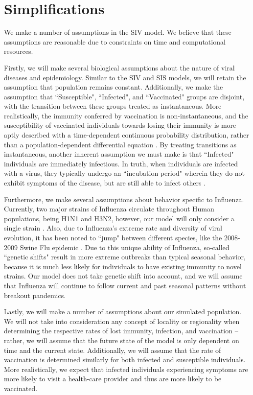\documentclass[12pt]{article}
\begin{document}
\section{Simplifications}
We make a number of assumptions in the SIV model. We believe that these assumptions are reasonable due to constraints on time and computational resources.

Firstly, we will make several biological assumptions about the nature of viral diseases and epidemiology. Similar to the SIV and SIS models, we will retain the assumption that population remains constant. Additionally, we make the assumption that ``Susceptible", ``Infected", and ``Vaccinated" groups are disjoint, with the transition between these groups treated as instantaneous. More realistically, the immunity conferred by vaccination is non-instantaneous, and the susceptibility of vaccinated individuals  towards losing their immunity is more aptly described with a time-dependent continuous probability distribution, rather than a population-dependent differential equation \citep{park2009quantifying}. By treating transitions as instantaneous, another inherent assumption we must make is that ``Infected" individuals are immediately infectious. In truth, when individuals are infected with a virus, they typically undergo an ``incubation period" wherein they do not exhibit symptoms of the disease, but are still able to infect others \citep{krugman1959infectious}.

Furthermore, we make several assumptions about behavior specific to Influenza. Currently, two major strains of Influenza circulate throughout Human populations, being H1N1 and H3N2, however, our model will only consider a single strain \citep{bedford2015global}. Also, due to Influenza's extreme rate and diversity of viral evolution, it has been noted to ``jump" between different species, like the 2008-2009 Swine Flu epidemic \citep{smith2009origins}. Due to this unique ability of Influenza, so-called ``genetic shifts" result in more extreme outbreaks than typical seasonal behavior, because it is much less likely for individuals to have existing immunity to novel strains. Our model does not take genetic shift into account, and we will assume that Influenza will continue to follow current and past seasonal patterns without breakout pandemics.

Lastly, we will make a number of assumptions about our simulated population. We will not take into consideration any concept of locality or regionality when determining the respective rates of lost immunity, infection, and vaccination -- rather, we will assume that the future state of the model is only dependent on time and the current state. Additionally, we will assume that the rate of vaccination is determined similarly for both infected and susceptible individuals. More realistically, we expect that infected individuals experiencing symptoms are more likely to visit a health-care provider and thus are more likely to be vaccinated.
\end{document}
